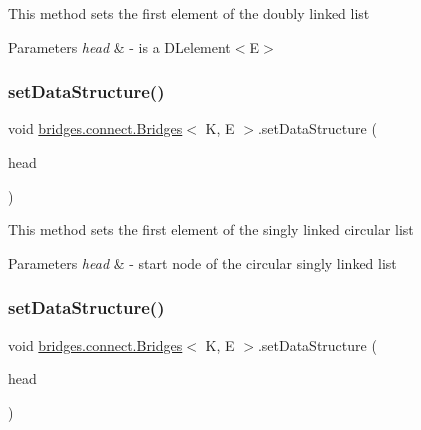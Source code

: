 This method sets the first element of the doubly linked list


\begin{DoxyParams}{Parameters}
{\em head} & -\/ is a D\+Lelement$<$\+E$>$ \\
\hline
\end{DoxyParams}
\hypertarget{classbridges_1_1connect_1_1_bridges_a285a7af5ad0594d4eeca51277e627c89}{}\label{classbridges_1_1connect_1_1_bridges_a285a7af5ad0594d4eeca51277e627c89} 
\subsubsection{\texorpdfstring{set\+Data\+Structure()}{setDataStructure()}\hspace{0.1cm}{\footnotesize\ttfamily [5/12]}}
{\footnotesize\ttfamily void \hyperlink{classbridges_1_1connect_1_1_bridges}{bridges.\+connect.\+Bridges}$<$ K, E $>$.set\+Data\+Structure (\begin{DoxyParamCaption}\item[{\hyperlink{classbridges_1_1base_1_1_circ_s_lelement}{Circ\+S\+Lelement}$<$ E $>$}]{head }\end{DoxyParamCaption})}

This method sets the first element of the singly linked circular list


\begin{DoxyParams}{Parameters}
{\em head} & -\/ start node of the circular singly linked list \\
\hline
\end{DoxyParams}
\hypertarget{classbridges_1_1connect_1_1_bridges_a4e5809b18d15854b54509f9d434a4fd7}{}\label{classbridges_1_1connect_1_1_bridges_a4e5809b18d15854b54509f9d434a4fd7} 
\subsubsection{\texorpdfstring{set\+Data\+Structure()}{setDataStructure()}\hspace{0.1cm}{\footnotesize\ttfamily [6/12]}}
{\footnotesize\ttfamily void \hyperlink{classbridges_1_1connect_1_1_bridges}{bridges.\+connect.\+Bridges}$<$ K, E $>$.set\+Data\+Structure (\begin{DoxyParamCaption}\item[{\hyperlink{classbridges_1_1base_1_1_circ_d_lelement}{Circ\+D\+Lelement}$<$ E $>$}]{head }\end{DoxyParamCaption})}

